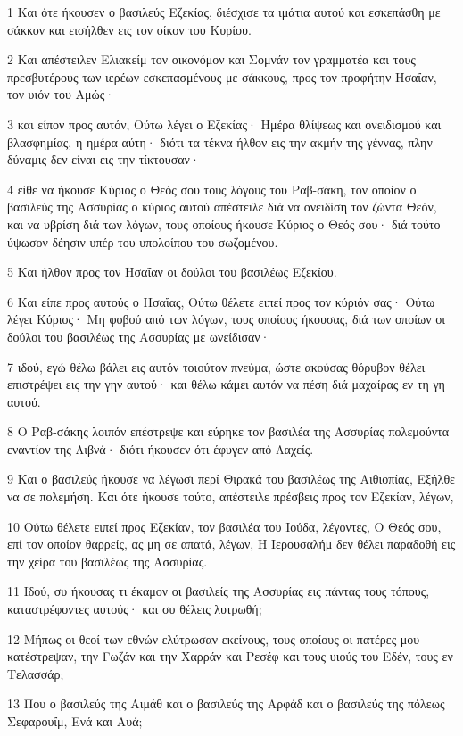 \par 1 Και ότε ήκουσεν ο βασιλεύς Εζεκίας, διέσχισε τα ιμάτια αυτού και εσκεπάσθη με σάκκον και εισήλθεν εις τον οίκον του Κυρίου.
\par 2 Και απέστειλεν Ελιακείμ τον οικονόμον και Σομνάν τον γραμματέα και τους πρεσβυτέρους των ιερέων εσκεπασμένους με σάκκους, προς τον προφήτην Ησαΐαν, τον υιόν του Αμώς·
\par 3 και είπον προς αυτόν, Ούτω λέγει ο Εζεκίας· Ημέρα θλίψεως και ονειδισμού και βλασφημίας, η ημέρα αύτη· διότι τα τέκνα ήλθον εις την ακμήν της γέννας, πλην δύναμις δεν είναι εις την τίκτουσαν·
\par 4 είθε να ήκουσε Κύριος ο Θεός σου τους λόγους του Ραβ-σάκη, τον οποίον ο βασιλεύς της Ασσυρίας ο κύριος αυτού απέστειλε διά να ονειδίση τον ζώντα Θεόν, και να υβρίση διά των λόγων, τους οποίους ήκουσε Κύριος ο Θεός σου· διά τούτο ύψωσον δέησιν υπέρ του υπολοίπου του σωζομένου.
\par 5 Και ήλθον προς τον Ησαΐαν οι δούλοι του βασιλέως Εζεκίου.
\par 6 Και είπε προς αυτούς ο Ησαΐας, Ούτω θέλετε ειπεί προς τον κύριόν σας· Ούτω λέγει Κύριος· Μη φοβού από των λόγων, τους οποίους ήκουσας, διά των οποίων οι δούλοι του βασιλέως της Ασσυρίας με ωνείδισαν·
\par 7 ιδού, εγώ θέλω βάλει εις αυτόν τοιούτον πνεύμα, ώστε ακούσας θόρυβον θέλει επιστρέψει εις την γην αυτού· και θέλω κάμει αυτόν να πέση διά μαχαίρας εν τη γη αυτού.
\par 8 Ο Ραβ-σάκης λοιπόν επέστρεψε και εύρηκε τον βασιλέα της Ασσυρίας πολεμούντα εναντίον της Λιβνά· διότι ήκουσεν ότι έφυγεν από Λαχείς.
\par 9 Και ο βασιλεύς ήκουσε να λέγωσι περί Θιρακά του βασιλέως της Αιθιοπίας, Εξήλθε να σε πολεμήση. Και ότε ήκουσε τούτο, απέστειλε πρέσβεις προς τον Εζεκίαν, λέγων,
\par 10 Ούτω θέλετε ειπεί προς Εζεκίαν, τον βασιλέα του Ιούδα, λέγοντες, Ο Θεός σου, επί τον οποίον θαρρείς, ας μη σε απατά, λέγων, Η Ιερουσαλήμ δεν θέλει παραδοθή εις την χείρα του βασιλέως της Ασσυρίας.
\par 11 Ιδού, συ ήκουσας τι έκαμον οι βασιλείς της Ασσυρίας εις πάντας τους τόπους, καταστρέφοντες αυτούς· και συ θέλεις λυτρωθή;
\par 12 Μήπως οι θεοί των εθνών ελύτρωσαν εκείνους, τους οποίους οι πατέρες μου κατέστρεψαν, την Γωζάν και την Χαρράν και Ρεσέφ και τους υιούς του Εδέν, τους εν Τελασσάρ;
\par 13 Που ο βασιλεύς της Αιμάθ και ο βασιλεύς της Αρφάδ και ο βασιλεύς της πόλεως Σεφαρουΐμ, Ενά και Αυά;
